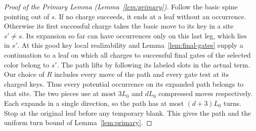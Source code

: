 \begin{proof}[Proof of the Primary Lemma (Lemma~\ref{lem:primary})]
Follow the basic spine pointing out of \(s\). If no charge succeeds, it
ends at a leaf without an occurrence. Otherwise its first successful
charge takes the basic move to its key in a site \(s'\ne s\). Its
expansion so far can have occurrences only on this last leg, which lies
in \(s'\). At this good key local realizability and Lemma~\ref{lem:final-gates}
supply a continuation to a leaf on which all charges to successful final
gates of the selected color belong to \(s'\). The path lifts by following
its labeled slots in the actual term. Our choice of \(R\) includes every
move of the path and every gate test at its charged keys. Thus every
potential occurrence on its expanded path belongs to that site.
The two pieces use at most \(3L_0\) and \(dL_0\) compressed moves
respectively. Each expands in a single direction, so the path has at
most \((d+3)L_0\) turns. Stop at the original leaf before any temporary
blank. This gives the path and the uniform turn bound of
Lemma~\ref{lem:primary}.
\end{proof}
